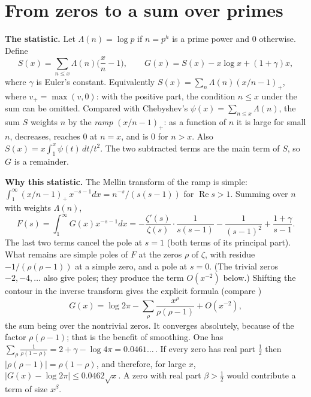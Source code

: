 \documentclass[11pt,letterpaper]{article}
\newcommand{\re}{\operatorname{Re}}
\begin{document}
\section{From zeros to a sum over primes}

\textbf{The statistic.} Let $\Lambda(n)=\log p$ if $n=p^h$ is a prime power and $0$ otherwise. Define
\begin{equation}\label{D:2}
 S(x)=\sum_{n\le x}\Lambda(n)\Big(\frac xn-1\Big),\qquad
 G(x)=S(x)-x\log x+(1+\gamma)x ,
\end{equation}
where $\gamma$ is Euler's constant. Equivalently $S(x)=\sum_n\Lambda(n)(x/n-1)_+$, where $v_+=\max(v,0)$: with the
positive part, the condition $n\le x$ under the sum can be omitted. Compared with Chebyshev's $\psi(x)=\sum_{n\le x}\Lambda(n)$, the sum
$S$ weights $n$ by the \emph{ramp} $(x/n-1)_+$: as a function of $n$ it is large for small $n$, decreases,
reaches $0$ at $n=x$, and is $0$ for $n>x$. Also
$S(x)=x\int_1^x\psi(t)\,dt/t^2$. The two subtracted terms are the main term of $S$, so $G$ is a remainder.

\textbf{Why this statistic.} The Mellin transform of the ramp is simple:
$\int_1^\infty (x/n-1)_+\,x^{-s-1}dx=n^{-s}/(s(s-1))$ for $\re s>1$. Summing over $n$ with weights
$\Lambda(n)$,
\begin{equation}\label{F}
 F(s)=\int_1^\infty G(x)x^{-s-1}dx
 =-\frac{\zeta'(s)}{\zeta(s)}\cdot\frac1{s(s-1)}-\frac1{(s-1)^2}+\frac{1+\gamma}{s-1}.
\end{equation}
The last two terms cancel the pole at $s=1$ (both terms of its principal part). What remains are simple poles of $F$ at the zeros $\rho$
of $\zeta$, with residue $-1/(\rho(\rho-1))$ at a simple zero, and a pole at $s=0$. (The trivial zeros
$-2,-4,\ldots$ also give poles; they produce the term $O(x^{-2})$ below.) Shifting the contour in
the inverse transform gives the explicit formula (compare \cite[Ch.~17]{Dav00})
\begin{equation}\label{D:4}
 G(x)=\log 2\pi-\sum_\rho\frac{x^\rho}{\rho(\rho-1)}+O(x^{-2}),
\end{equation}
the sum being over the nontrivial zeros. It converges absolutely, because of the factor $\rho(\rho-1)$; that
is the benefit of smoothing. One has $\sum_\rho\frac1{\rho(1-\rho)}=2+\gamma-\log4\pi=0.0461\ldots$\,. If every zero has real part
$\frac12$ then $|\rho(\rho-1)|=\rho(1-\rho)$, and therefore, for large $x$,
$|G(x)-\log2\pi|\le 0.0462\sqrt x$. A zero with
real part $\beta>\frac12$ would contribute a term of size $x^\beta$.
\end{document}
